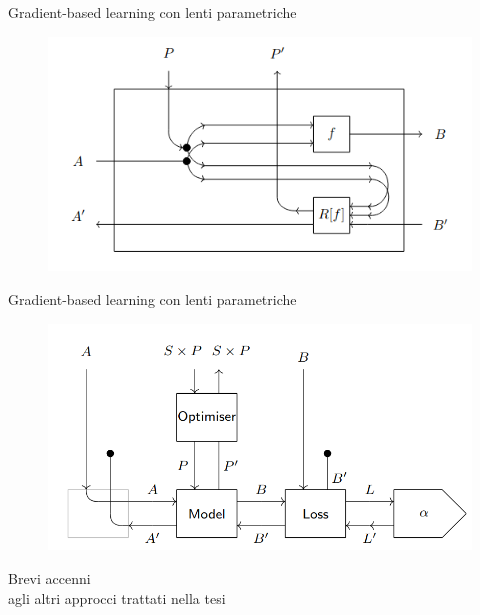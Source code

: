 \documentclass{beamer}
\begin{document}
\begin{frame}{Gradient-based learning con lenti parametriche}
    \begin{figure}
        \begin{center}
            \includegraphics[width=\textwidth]{figures/parametric_lens.png}
            \caption*{\cite{cruttwell2022categorical}}
        \end{center}
    \end{figure}
\end{frame}

\begin{frame}{Gradient-based learning con lenti parametriche}
    \begin{figure}
        \begin{center}
            \includegraphics[width=\textwidth]{figures/lenses_supervised_learning2.png}
            \caption*{\cite{cruttwell2022categorical}}
        \end{center}
    \end{figure}
\end{frame}

\begin{frame}[standout]
    \huge Brevi accenni \\\large agli altri approcci trattati nella tesi
\end{frame}
\end{document}
